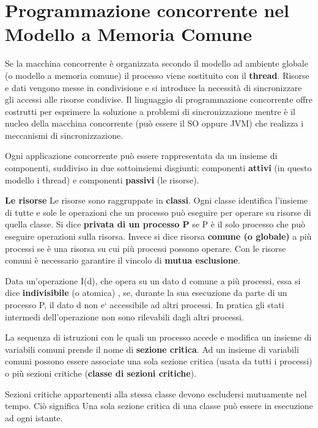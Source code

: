 \documentclass{article}
\begin{document}
\section{Programmazione concorrente nel Modello a Memoria Comune}
\noindent Se la macchina concorrente è organizzata secondo il modello ad ambiente globale (o modello a memoria comune) il processo viene sostituito con il \textbf{thread}.
Risorse e dati vengono messe in condivisione e si introduce la necessità di sincronizzare gli accessi alle risorse condivise. Il linguaggio di programmazione concorrente
 offre costrutti per esprimere la soluzione a problemi di sincronizzazione mentre è il nucleo della macchina concorrente (può essere il SO oppure JVM)
 che realizza i meccanismi di sincronizzazione.
\medskip

\noindent Ogni applicazione concorrente può essere rappresentata da un insieme di componenti, suddiviso in due sottoinsiemi disgiunti: componenti \textbf{attivi} (in questo modello
 i thread) e componenti \textbf{passivi} (le risorse).

\noindent \textbf{Le risorse} Le risorse sono raggruppate in \textbf{classi}. Ogni classe identifica l'insieme di tutte e sole le operazioni che un processo può eseguire per operare 
su risorse di quella classe. Si dice \textbf{privata di un processo P} se P è il solo processo che può eseguire operazioni sulla risorsa. Invece si dice risorsa
 \textbf{comune (o globale)} a più processi se è una risorsa su cui più processi possono operare. Con le risorse comuni è necessario garantire il vincolo di
  \textbf{mutua esclusione}.

\noindent Data un'operazione I(d), che opera su un dato d comune a più processi, essa si dice \textbf{indivisibile} (o atomica) , se,
durante la sua esecuzione da parte di un processo P, il dato d non e` accessibile ad altri processi. In pratica gli stati intermedi 
dell'operazione non sono rilevabili dagli altri processi.

\noindent La sequenza di istruzioni con le quali un processo accede e modifica un insieme di variabili comuni prende il nome di \textbf{sezione critica}.
Ad un insieme di variabili comuni possono essere associate una sola sezione critica (usata da tutti i processi) o più sezioni critiche 
(\textbf{classe di sezioni critiche}).

\noindent Sezioni critiche appartenenti alla stessa classe devono escludersi mutuamente nel tempo. Ciò significa Una sola sezione critica di una
 classe può essere in esecuzione ad ogni istante.
\end{document}
